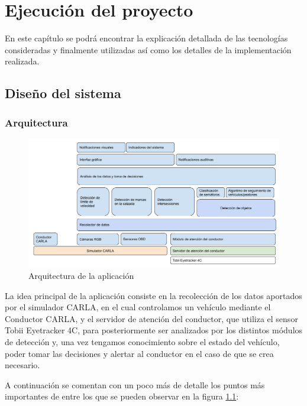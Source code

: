 \chapter{Ejecución del proyecto}\label{capEjecucion}

En este capítulo se podrá encontrar la explicación detallada de las tecnologías consideradas y finalmente utilizadas así como los detalles de la implementación realizada.

\section{Diseño del sistema}\label{sec:diseñosistema}
\subsection{Arquitectura}

\begin{figure}[h!]
    \centering
    \includegraphics[width=\linewidth]{img/Arquitectura Aplicacion.png}
    \caption{Arquitectura de la aplicación}
    \label{fig:arquitecturaApp}
\end{figure}


La idea principal de la aplicación consiste en la recolección de los datos aportados por el simulador CARLA, en el cual controlamos un vehículo mediante el Conductor CARLA, y el servidor de atención del conductor, que utiliza el sensor Tobii Eyetracker 4C, para posteriormente ser analizados por los distintos módulos de detección y, una vez tengamos conocimiento sobre el estado del vehículo, poder tomar las decisiones y alertar al conductor en el caso de que se crea necesario.


A continuación se comentan con un poco más de detalle los puntos más importantes de entre los que se pueden observar en la figura \ref{fig:arquitecturaApp}:

